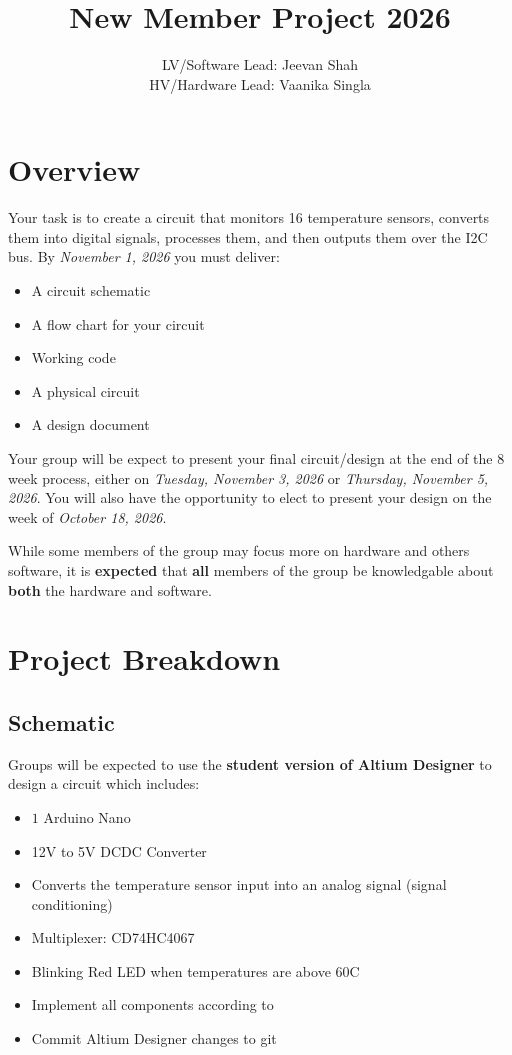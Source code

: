 \documentclass{article}
\title{New Member Project 2026}
\author{LV/Software Lead: Jeevan Shah \\ HV/Hardware Lead: Vaanika Singla}
\begin{document}
    \maketitle
    \section*{Overview}
    Your task is to create a circuit that monitors 16 temperature sensors, converts them into digital signals, processes them, and then outputs them over the I2C bus. By \textit{November 1, 2026} you must deliver:
    \begin{itemize}
        \item A circuit schematic
        \item A flow chart for your circuit
        \item Working code
        \item A physical circuit
        \item A design document
    \end{itemize}
    Your group will be expect to present your final circuit/design at the end of the $8$ week process, either on \textit{Tuesday, November 3, 2026} or \textit{Thursday, November 5, 2026}. You will also have the opportunity to elect to present your design on the week of \textit{October 18, 2026}. 

    While some members of the group may focus more on hardware and others software, it is \textbf{expected} that \textbf{all} members of the group be knowledgable about \textbf{both} the hardware and software.
    
    \section*{Project Breakdown}
    \subsection*{Schematic}
    Groups will be expected to use the \textbf{student version of Altium Designer} to design a circuit which includes:
    \begin{itemize}
        \item $1$ Arduino Nano
        \item 12V to 5V DCDC Converter
        \item Converts the temperature sensor input into an analog signal (signal conditioning) 
        \item Multiplexer: CD74HC4067
        \item Blinking Red LED when temperatures are above 60C
        \item Implement all components according to 
        \item Commit Altium Designer changes to git 
    \end{itemize}
\end{document}
